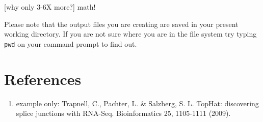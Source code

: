 [why only 3-6X more?] math!

\begin{note}
Please note that the output files you are creating are saved in your present working directory. If you are not sure where you are in the file system try typing \texttt{pwd} on your command prompt to find out.
\end{note}


\newpage


\section{References}

\begin{enumerate}
  \item example only: Trapnell, C., Pachter, L. \& Salzberg, S. L. TopHat: discovering splice
  junctions with RNA-Seq. Bioinformatics 25, 1105-1111 (2009).
  
\end{enumerate}
